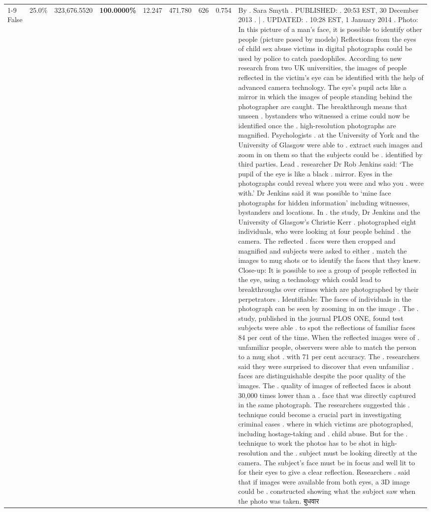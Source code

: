 \begin{table}[H]
\begin{tabular}{lllrlllll}
\cline{1-9}
False & 25.0\% & 323,676.5520 & \bfseries \color{red} 100.0000\% & 12.247 & 471.780 & 626 & 0.754 & By . Sara Smyth . PUBLISHED: . 20:53 EST, 30 December 2013 . | . UPDATED: . 10:28 EST, 1 January 2014 . Photo: In this picture of a man's face, it is possible to identify other people (picture posed by models) Reflections from the eyes of child sex abuse victims in digital photographs could be used by police to catch paedophiles. According to new research from two UK universities, the images of people reflected in the victim's eye can be identified with the help of advanced camera technology. The eye's pupil acts like a mirror in which the images of people standing behind the photographer are caught. The breakthrough means that unseen . bystanders who witnessed a crime could now be identified once the . high-resolution photographs are magnified. Psychologists . at the University of York and the University of Glasgow were able to . extract such images and zoom in on them so that the subjects could be . identified by third parties. Lead . researcher Dr Rob Jenkins said: ‘The pupil of the eye is like a black . mirror. Eyes in the photographs could reveal where you were and who you . were with.' Dr Jenkins said it was possible to ‘mine face photographs for hidden information' including witnesses, bystanders and locations. In . the study, Dr Jenkins and the University of Glasgow's Christie Kerr . photographed eight individuals, who were looking at four people behind . the camera. The reflected . faces were then cropped and magnified and subjects were asked to either . match the images to mug shots or to identify the faces that they knew. Close-up: It is possible to see a group of people reflected in the eye, using a technology which could lead to breakthroughs over crimes which are photographed by their perpetrators . Identifiable: The faces of individuals in the photograph can be seen by zooming in on the image . The . study, published in the journal PLOS ONE, found test subjects were able . to spot the reflections of familiar faces 84 per cent of the time. When the reflected images were of . unfamiliar people, observers were able to match the person to a mug shot . with 71 per cent accuracy. The . researchers said they were surprised to discover that even unfamiliar . faces are distinguishable despite the poor quality of the images. The . quality of images of reflected faces is about 30,000 times lower than a . face that was directly captured in the same photograph. The researchers suggested this . technique could become a crucial part in investigating criminal cases . where in which victims are photographed, including hostage-taking and . child abuse. But for the . technique to work the photos has to be shot in high-resolution and the . subject must be looking directly at the camera. The subject's face must be in focus and well lit to for their eyes to give a clear reflection. Researchers . said that if images were available from both eyes, a 3D image could be . constructed showing what the subject saw when the photo was taken. बुधवार \\

\end{tabular}
\end{table}
